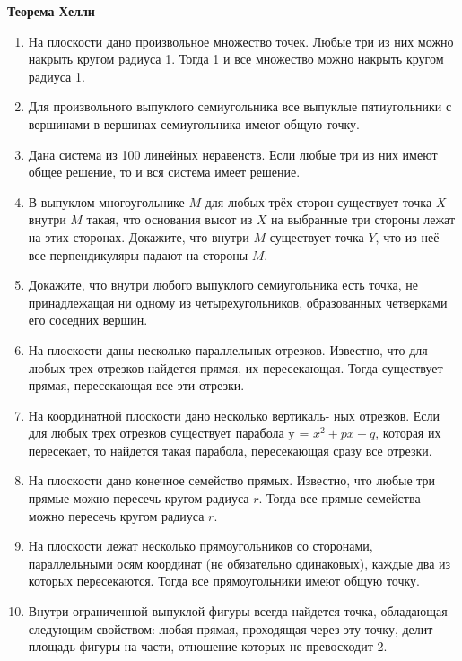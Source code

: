 \documentclass{article}
\begin{document}
\large
	
\begin{center}
	\textbf{Теорема Хелли}
\end{center}

\begin{enumerate}[label*=\protect\fbox{\arabic{enumi}}]
	
\item На плоскости дано произвольное множество точек. Любые три из них можно накрыть кругом радиуса 1. Тогда 1 и все множество можно накрыть кругом радиуса 1.

\item Для произвольного выпуклого семиугольника все выпуклые пятиугольники с вершинами в вершинах семиугольника имеют общую точку.

\item Дана система из 100 линейных неравенств. Если любые три из них имеют общее решение, то и вся система имеет решение.

\item В выпуклом многоугольнике $M$ для любых трёх сторон существует точка $X$ внутри $M$ такая, что основания высот из $X$ на выбранные три стороны лежат на этих сторонах. Докажите, что внутри $M$ существует точка $Y$, что из неё все перпендикуляры падают на стороны $M$.

\item Докажите, что внутри любого выпуклого семиугольника есть точка, не принадлежащая ни одному из четырехугольников, образованных четверками его соседних вершин.

\item На плоскости даны несколько параллельных отрезков. Известно, что для любых трех отрезков найдется прямая, их пересекающая. Тогда существует прямая, пересекающая все эти отрезки.

\item На координатной плоскости дано несколько вертикаль- ных отрезков. Если для любых трех отрезков существует парабола y = $x^2 + px + q$, которая их пересекает, то найдется такая парабола, пересекающая сразу все отрезки.

\item На плоскости дано конечное семейство прямых. Известно, что любые три прямые можно пересечь кругом радиуса $r$. Тогда все прямые семейства можно пересечь кругом радиуса $r$.

\item На плоскости лежат несколько прямоугольников со сторонами, параллельными осям координат (не обязательно одинаковых), каждые два из которых пересекаются. Тогда все прямоугольники имеют общую точку.

\item Внутри ограниченной выпуклой фигуры всегда найдется точка, обладающая следующим свойством: любая прямая, проходящая через эту точку, делит площадь фигуры на части, отношение которых не превосходит 2.

\end{enumerate}
\end{document}
